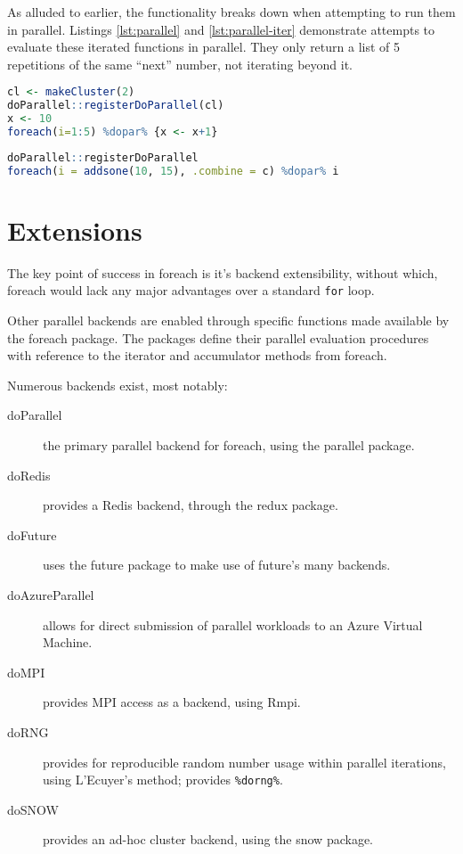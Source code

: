 \documentclass[a4paper,10pt]{article}
\begin{document}
As alluded to earlier, the functionality breaks down when attempting to run
them in parallel.
Listings \ref{lst:parallel} and \ref{lst:parallel-iter} demonstrate attempts to
evaluate these iterated functions in parallel.
They only return a list of 5 repetitions of the same ``next'' number, not
iterating beyond it.

\begin{lstlisting}[language=R,caption={Parallel Iteration attempt through destructive reassignment},label=lst:parallel]
cl <- makeCluster(2)
doParallel::registerDoParallel(cl)
x <- 10
foreach(i=1:5) %dopar% {x <- x+1}
\end{lstlisting}

\begin{lstlisting}[language=R,caption={Parallel Iteration attempt through a stateful iterator},label=lst:parallel-iter]
doParallel::registerDoParallel
foreach(i = addsone(10, 15), .combine = c) %dopar% i
\end{lstlisting}

\section{Extensions}
\label{sec:extensions}

The key point of success in foreach is it's backend extensibility,
without which, foreach would lack any major advantages over a standard
\texttt{for} loop.

Other parallel backends are enabled through specific functions made
available by the foreach package. The packages define their parallel
evaluation procedures with reference to the iterator and accumulator
methods from foreach.

Numerous backends exist, most notably:
\begin{description}
	\item[doParallel] the primary parallel backend for foreach, using the
	      parallel package\cite{corporation19}.
	\item[doRedis]  provides a Redis backend, through the redux package\cite{lewis20}.
	\item[doFuture] uses the future package to make use of future's many
	      backends\cite{bengtsson20do}.
	\item[doAzureParallel] allows for direct submission of parallel
	      workloads to an Azure Virtual Machine\cite{hoang20}.
	\item[doMPI] provides MPI access as a backend, using Rmpi\cite{weston17}.
	\item[doRNG] provides for reproducible random number usage within
	      parallel iterations, using L'Ecuyer's method; provides
	      \texttt{\%dorng\%}\cite{gaujoux20}.
	\item[doSNOW] provides an ad-hoc cluster backend, using the snow
	      package\cite{dosnow19}.
\end{description}
\end{document}
